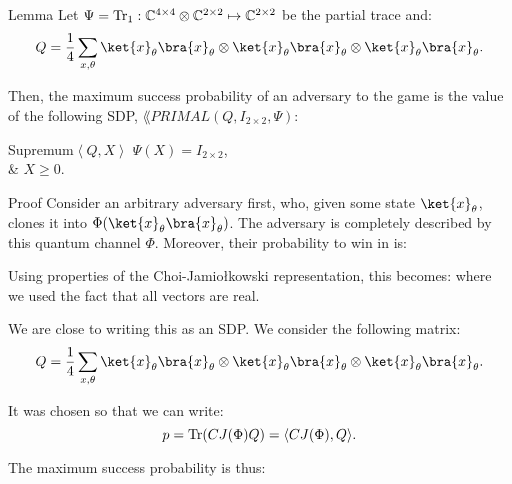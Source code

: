 \documentclass[a4paper]{article}
\begin{document}
\begin{parag}{Lemma}
    Let $\Psi = \operatorname{Tr}_1: \mathbb{C}^{4 \times 4} \otimes \mathbb{C}^{2 \times 2} \mapsto \mathbb{C}^{2 \times 2}$ be the partial trace and: 
    \[Q = \frac{1}{4} \sum_{x, \theta} \ket{x}_{\theta}\bra{x}_{\theta} \otimes \ket{x}_{\theta}\bra{x}_{\theta} \otimes \ket{x}_{\theta}\bra{x}_{\theta}.\]

    Then, the maximum success probability of an adversary to the  game is the value of the following SDP, $\lang{PRIMAL}\left(Q, I_{2 \times 2}, \Psi\right)$:
    \begin{semidefiniteprogram}{Supremum}{$\left\langle Q, X \right\rangle$}
        $\Psi\left(X\right) = I_{2 \times 2}$,\\
        & $X \geq 0$.
    \end{semidefiniteprogram}

    \begin{subparag}{Proof}
        Consider an arbitrary adversary first, who, given some state $\ket{x}_{\theta}$, clones it into $\Phi\left(\ket{x}_{\theta} \bra{x}_{\theta}\right)$. The adversary is completely described by this quantum channel $\Phi$. Moreover, their probability to win in  is:

        Using properties of the Choi-Jamio{\l}kowski representation, this becomes: 
        where we used the fact that all vectors are real.

        We are close to writing this as an SDP. We consider the following matrix: 
        \[Q = \frac{1}{4} \sum_{x, \theta} \ket{x}_{\theta}\bra{x}_{\theta} \otimes \ket{x}_{\theta}\bra{x}_{\theta} \otimes \ket{x}_{\theta}\bra{x}_{\theta}.\]

        It was chosen so that we can write:
        \[p = \Tr\left(CJ\left(\Phi\right) Q\right) = \left\langle CJ\left(\Phi\right), Q \right\rangle.\]

        The maximum success probability is thus: 


\end{subparag}
\end{parag}
\end{document}
